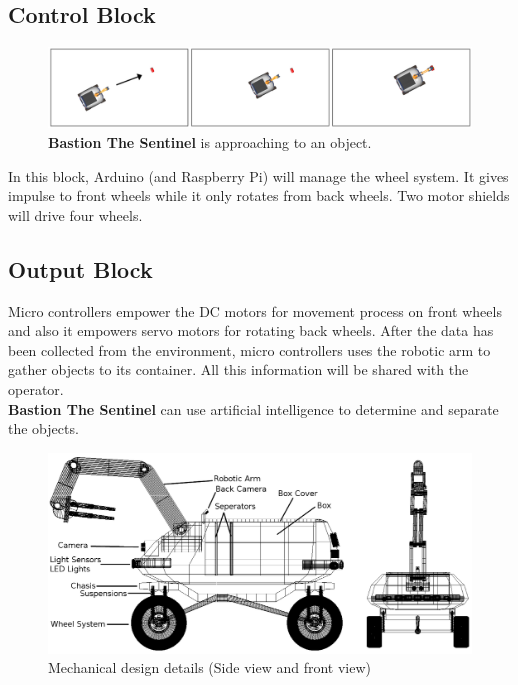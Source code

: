\documentclass[12pt,a4paper]{article}
\begin{document}
   \subsection{Control Block}
    \begin{flushleft}
     \begin{figure}[h!]
      \begin{center}
       \includegraphics[scale=0.3]{3frame}
       \caption{\textbf{Bastion The Sentinel} is approaching to an object.}
      \end{center}
     \end{figure}
     In this block, Arduino (and Raspberry Pi) will manage the wheel system. It gives impulse to front wheels while it only 
     rotates from back wheels. Two motor shields will drive four wheels.
    \end{flushleft}

   \subsection{Output Block}
    \begin{flushleft}
     Micro controllers empower the DC motors for movement process on front wheels and also it empowers servo motors for 
     rotating back wheels. After the data has been collected from the environment, micro controllers uses the robotic arm 
     to gather objects to its container. All this information will be shared with the operator.\\
     \textbf{Bastion The Sentinel} can use artificial intelligence to determine and separate the objects.\\
     \bigskip
     \begin{figure}[h]
      \begin{center}
       \includegraphics[scale=0.4]{skeleton_detailed}
       \caption{Mechanical design details (Side view and front view)}
      \end{center}
     \end{figure}
     \bigskip
    \end{flushleft}
\end{document}
